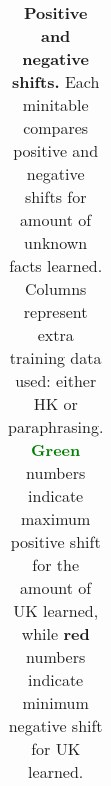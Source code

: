 \begin{table}[!ht]
{\begin{tabular}{lrrrrr}
\end{tabular}
}
\caption{\textbf{Positive and negative shifts.} Each minitable compares positive and negative shifts for amount of unknown facts learned. Columns represent extra training data used: either HK or paraphrasing. \textbf{\textcolor{Green}{Green}}  numbers indicate maximum positive shift for the amount of UK learned, while \textbf{\textcolor{BrickRed}{red}}  numbers indicate minimum negative shift for UK learned. }



\label{good_bad_shifts}
\end{table}
